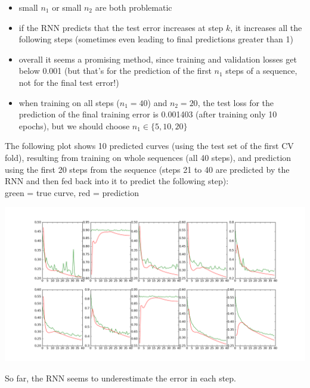 \documentclass[a4paper,10pt]{article}
\begin{document}
\begin{itemize}
 \item small $n_1$ or small $n_2$ are both problematic
 \item if the RNN predicts that the test error increases at step $k$, it increases all the following steps (sometimes even leading to final predictions greater than 1)
 \item overall it seems a promising method, since training and validation losses get below 0.001 (but that's for the prediction of the first $n_1$ steps
  of a sequence, not for the final test error!)
 \item when training on all steps ($n_1 = 40$) and $n_2 = 20$, the test loss for the prediction of the final training error is 0.001403 (after training only 10 epochs),
  but we should choose $n_1 \in \{5, 10, 20\}$
\end{itemize}

The following plot shows 10 predicted curves (using the test set of the first CV fold), resulting from training on whole sequences (all 40 steps), and prediction using the first 20 steps
from the sequence (steps 21 to 40 are predicted by the RNN and then fed back into it to predict the following step):\\
green = true curve, red = prediction

\includegraphics[width=\textwidth]{../../figures/lstm_many2many_39train-steps_20pred-steps}

So far, the RNN seems to underestimate the error in each step.
\end{document}
